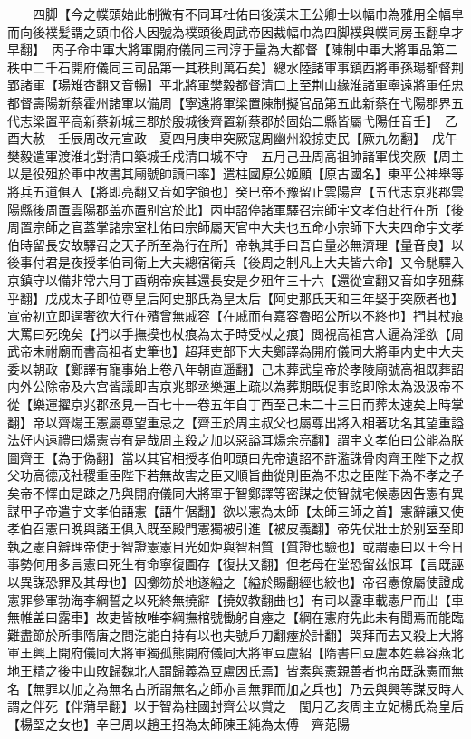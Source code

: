 　　四脚【今之幞頭始此制微有不同耳杜佑曰後漢末王公卿士以幅巾為雅用全幅皁而向後襆髪謂之頭巾俗人因號為襆頭後周武帝因裁幅巾為四脚襆與幞同房玉翻皁才早翻】　丙子命中軍大將軍開府儀同三司淳于量為大都督【陳制中軍大將軍品第二秩中二千石開府儀同三司品第一其秩則萬石矣】總水陸諸軍事鎮西將軍孫瑒都督荆郢諸軍【瑒雉杏翻又音暢】平北將軍樊毅都督清口上至荆山緣淮諸軍寧遠將軍任忠都督壽陽新蔡霍州諸軍以備周【寧遠將軍梁置陳制擬官品第五此新蔡在弋陽郡界五代志梁置平高新蔡新城三郡於殷城後齊置新蔡郡於固始二縣皆屬弋陽任音壬】　乙酉大赦　壬辰周改元宣政　夏四月庚申突厥寇周幽州殺掠吏民【厥九勿翻】　戊午樊毅遣軍渡淮北對清口築城壬戍清口城不守　五月己丑周高祖帥諸軍伐突厥【周主以是役殂於軍中故書其廟號帥讀曰率】遣柱國原公姬願【原古國名】東平公神舉等將兵五道俱入【將即亮翻又音如字領也】癸巳帝不豫留止雲陽宫【五代志京兆郡雲陽縣後周置雲陽郡盖亦置别宫於此】丙申詔停諸軍驛召宗師宇文孝伯赴行在所【後周置宗師之官蓋掌諸宗室杜佑曰宗師屬天官中大夫也五命小宗師下大夫四命宇文孝伯時留長安故驛召之天子所至為行在所】帝執其手曰吾自量必無濟理【量音良】以後事付君是夜授孝伯司衛上大夫總宿衛兵【後周之制凡上大夫皆六命】又令馳驛入京鎮守以備非常六月丁酉朔帝疾甚還長安是夕殂年三十六【還從宣翻又音如字殂蘇乎翻】戊戍太子即位尊皇后阿史那氏為皇太后【阿史那氏天和三年娶于突厥者也】宣帝初立即逞奢欲大行在殯曾無戚容【在戚而有嘉容魯昭公所以不終也】捫其杖痕大罵曰死晚矣【捫以手撫摸也杖痕為太子時受杖之痕】閲視高祖宫人逼為淫欲【周武帝未祔廟而書高祖者史筆也】超拜吏部下大夫鄭譯為開府儀同大將軍内史中大夫委以朝政【鄭譯有寵事始上卷八年朝直遥翻】己未葬武皇帝於孝陵廟號高祖既葬詔内外公除帝及六宫皆議即吉京兆郡丞樂運上疏以為葬期既促事訖即除太為汲汲帝不從【樂運擢京兆郡丞見一百七十一卷五年自丁酉至己未二十三日而葬太速矣上時掌翻】帝以齊煬王憲屬尊望重忌之【齊王於周主叔父也屬尊出將入相著功名其望重謚法好内遠禮曰煬憲豈有是哉周主殺之加以惡謚耳煬余亮翻】謂宇文孝伯曰公能為朕圖齊王【為于偽翻】當以其官相授孝伯叩頭曰先帝遺詔不許濫誅骨肉齊王陛下之叔父功高德茂社稷重臣陛下若無故害之臣又順旨曲從則臣為不忠之臣陛下為不孝之子矣帝不懌由是踈之乃與開府儀同大將軍于智鄭譯等密謀之使智就宅候憲因告憲有異謀甲子帝遣宇文孝伯語憲【語牛倨翻】欲以憲為太師【太師三師之首】憲辭讓又使孝伯召憲曰晩與諸王俱入既至殿門憲獨被引進【被皮義翻】帝先伏壯士於别室至即執之憲自辯理帝使于智證憲憲目光如炬與智相質【質證也驗也】或謂憲曰以王今日事勢何用多言憲曰死生有命寧復圖存【復扶又翻】但老母在堂恐留兹恨耳【言既誣以異謀恐罪及其母也】因擲笏於地遂縊之【縊於賜翻經也絞也】帝召憲僚屬使證成憲罪參軍勃海李綱誓之以死終無撓辭【撓奴教翻曲也】有司以露車載憲尸而出【車無帷盖曰露車】故吏皆散唯李綱撫棺號慟躬自瘞之【綱在憲府先此未有聞焉而能臨難盡節於所事隋唐之間汔能自持有以也夫號戶刀翻瘞於計翻】哭拜而去又殺上大將軍王興上開府儀同大將軍獨孤熊開府儀同大將軍豆盧紹【隋書曰豆盧本姓慕容燕北地王精之後中山敗歸魏北人謂歸義為豆盧因氏焉】皆素與憲親善者也帝既誅憲而無名【無罪以加之為無名古所謂無名之師亦言無罪而加之兵也】乃云與興等謀反時人謂之伴死【伴蒲旱翻】以于智為柱國封齊公以賞之　閠月乙亥周主立妃楊氏為皇后【楊堅之女也】辛巳周以趙王招為太師陳王純為太傅　齊范陽

